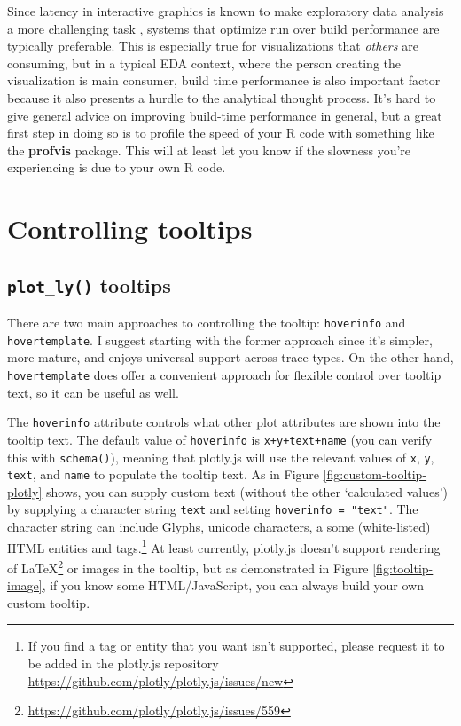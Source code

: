 \documentclass[
  12pt,
]{krantz}
\renewcommand{\href}[2]{#2\footnote{\url{#1}}}
\begin{document}
Since latency in interactive graphics is known to make exploratory data analysis a more challenging task \citep{2014-latency}, systems that optimize run over build performance are typically preferable. This is especially true for visualizations that \emph{others} are consuming, but in a typical EDA context, where the person creating the visualization is main consumer, build time performance is also important factor because it also presents a hurdle to the analytical thought process. It's hard to give general advice on improving build-time performance in general, but a great first step in doing so is to profile the speed of your R code with something like the \textbf{profvis} package. This will at least let you know if the slowness you're experiencing is due to your own R code.

\hypertarget{controlling-tooltips}{%
\chapter{Controlling tooltips}\label{controlling-tooltips}}


\hypertarget{tooltip-text}{%
\section{\texorpdfstring{\texttt{plot\_ly()} tooltips}{plot\_ly() tooltips}}\label{tooltip-text}}

There are two main approaches to controlling the tooltip: \texttt{hoverinfo} and \texttt{hovertemplate}. I suggest starting with the former approach since it's simpler, more mature, and enjoys universal support across trace types. On the other hand, \texttt{hovertemplate} does offer a convenient approach for flexible control over tooltip text, so it can be useful as well.

The \texttt{hoverinfo} attribute controls what other plot attributes are shown into the tooltip text. The default value of \texttt{hoverinfo} is \texttt{x+y+text+name} (you can verify this with \texttt{schema()}), meaning that plotly.js will use the relevant values of \texttt{x}, \texttt{y}, \texttt{text}, and \texttt{name} to populate the tooltip text. As in Figure \ref{fig:custom-tooltip-plotly} shows, you can supply custom text (without the other `calculated values') by supplying a character string \texttt{text} and setting \texttt{hoverinfo\ =\ "text"}. The character string can include Glyphs, unicode characters, a some (white-listed) HTML entities and tags.\footnote{If you find a tag or entity that you want isn't supported, please request it to be added in the plotly.js repository \url{https://github.com/plotly/plotly.js/issues/new}} At least currently, plotly.js doesn't support rendering of \href{https://github.com/plotly/plotly.js/issues/559}{LaTeX} or images in the tooltip, but as demonstrated in Figure \ref{fig:tooltip-image}, if you know some HTML/JavaScript, you can always build your own custom tooltip.
\end{document}
